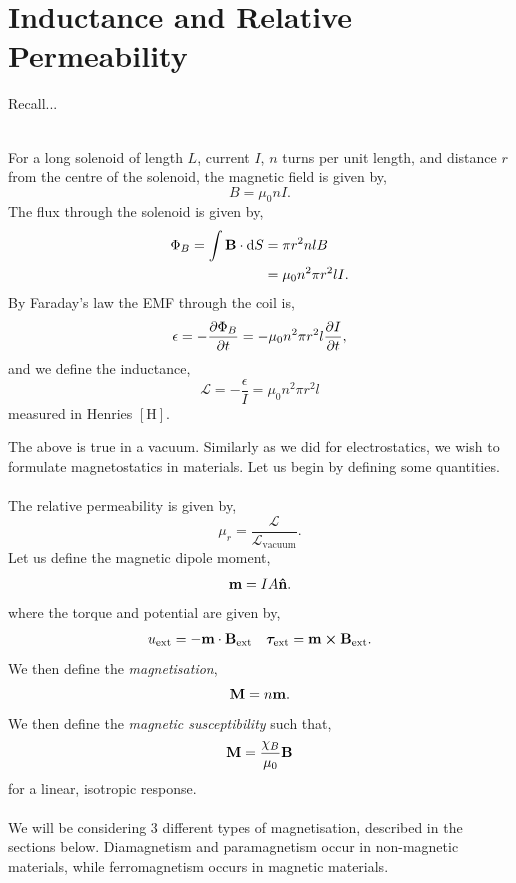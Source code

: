 \documentclass{book}
\begin{document}
\section{Inductance and Relative Permeability}
Recall...\\\\
\begin{tcolorbox}
For a long solenoid of length $L$, current $I$, $n$ turns per unit length, and distance $r$ from the centre of the solenoid, the magnetic field is given by,
\begin{equation}
	B = \mu_0 nI.
\end{equation}
The flux through the solenoid is given by,
\begin{equation}
	\begin{split}
	\Phi_B = \int \vb{B}\cdot\dd{S} & = \pi r^2 n l B \\
	& = \mu_0 n^2 \pi r^2 l I.
	\end{split}
\end{equation}
By Faraday's law the EMF through the coil is,
\begin{equation}
	\epsilon = -\pdv{\Phi_B}{t} = -\mu_0n^2\pi r^2 l \pdv{I}{t},
\end{equation}
and we define the inductance,
\begin{equation}
	\mathcal{L} = -\frac{\epsilon}{I} = \mu_0 n^2 \pi r^2 l
\end{equation}
measured in Henries $\left[\text{H}\right]$.
\end{tcolorbox}
\noindent
The above is true in a vacuum. Similarly as we did for electrostatics, we wish to formulate magnetostatics in materials. Let us begin by defining some quantities.
\\\\
The relative permeability is given by,
\begin{equation}
	\mu_r = \frac{\mathcal{L}}{\mathcal{L}_{\text{vacuum}}}.
\end{equation}
Let us define the magnetic dipole moment,
\begin{equation}
	\vb{m} = IA\vu{n}.
\end{equation}
where the torque and potential are given by,
\begin{align}
	u_{\text{ext}} = -\vb{m}\cdot\vb{B}_{\text{ext}} && \vb*{\tau}_{\text{ext}} = \vb{m}\cross\vb{B}_{\text{ext}}.
\end{align}
We then define the \textit{magnetisation},
\begin{equation}
	\vb{M} = n\vb{m}.
\end{equation}
We then define the \textit{magnetic susceptibility} such that,
\begin{equation}
	\vb{M} = \frac{\chi_B}{\mu_0}\vb{B} \label{eq:magnetic sus}
\end{equation}
for a linear, isotropic response.
\\\\
We will be considering 3 different types of magnetisation, described in the sections below. Diamagnetism and paramagnetism occur in non-magnetic materials, while ferromagnetism occurs in magnetic materials.
\end{document}
